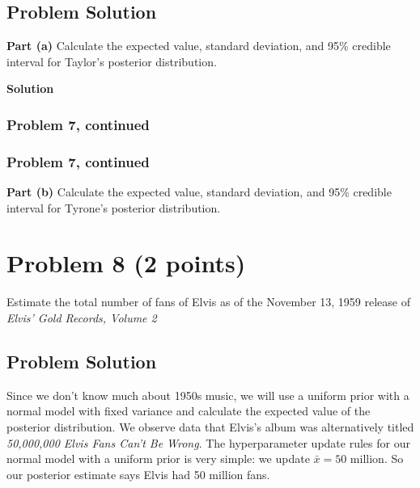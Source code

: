 \documentclass[12pt]{article}
\theoremstyle{definition}
\begin{document}
\subsection*{Problem Solution}

\bigskip
\noindent
{\bf Part (a)} Calculate the expected value, standard deviation, and 95\% credible interval for Taylor's posterior distribution.

\bigskip
\noindent
{\bf Solution}



\newpage
\subsubsection*{Problem 7, continued}


\newpage
\subsubsection*{Problem 7, continued}

\noindent
{\bf Part (b)} Calculate the expected value, standard deviation, and 95\% credible interval for Tyrone's posterior distribution.



\newpage
\section*{Problem 8 (2 points)}

Estimate the total number of fans of Elvis as of the November 13, 1959 release of {\em Elvis' Gold Records, Volume 2}

\subsection*{Problem Solution}


Since we don't know much about 1950s music, we will use a uniform prior with a normal model with fixed variance and calculate the expected value of the posterior distribution. We observe data that Elvis's album was alternatively titled \textit{50,000,000 Elvis Fans Can't Be Wrong}. The hyperparameter update rules for our normal model with a uniform prior is very simple: we update $\bar{x} = 50$ million. So our posterior estimate says Elvis had 50 million fans.
\end{document}
